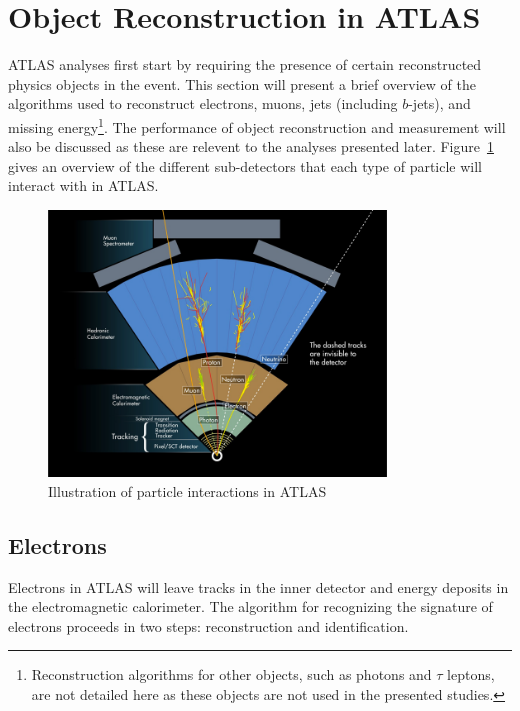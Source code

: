 \section{Object Reconstruction in ATLAS}

ATLAS analyses first start by requiring the presence of certain reconstructed physics objects in the event. This section will present a brief overview of the algorithms used to reconstruct electrons, muons, jets (including $b$-jets), and missing energy\footnote{Reconstruction algorithms for other objects, such as photons and $\tau$ leptons, are not detailed here as these objects are not used in the presented studies.}. The performance of object reconstruction and measurement will also be discussed as these are relevent to the analyses presented later. Figure~\ref{fig:reco_overview} gives an overview of the different sub-detectors that each type of particle will interact with in ATLAS. 

\begin{figure}[h!]
  \centering
  \captionsetup{justification=centering}

  \includegraphics[width=0.8\textwidth]{figures/ATLAS_reco}
   \caption{Illustration of particle interactions in ATLAS~\cite{ATLAS_Particles}}
  \label{fig:reco_overview}
\end{figure}

\subsection{Electrons}

Electrons in ATLAS will leave tracks in the inner detector and energy deposits in the electromagnetic calorimeter. The algorithm for recognizing the signature of electrons proceeds in two steps: reconstruction and identification. 

